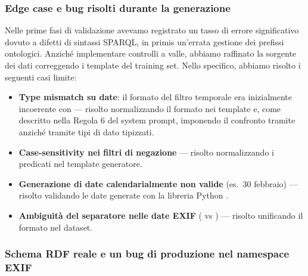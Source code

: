\newpage
\subsubsection{Edge case e bug risolti durante la generazione}\label{subsec:edge_cases_generazione}

Nelle prime fasi di validazione avevamo registrato un tasso di errore significativo dovuto a difetti di sintassi SPARQL, in primis un'errata gestione dei prefissi ontologici. Anziché implementare controlli a valle, abbiamo raffinato la sorgente dei dati correggendo i template del training set. Nello specifico, abbiamo risolto i seguenti casi limite:

\begin{itemize}
  \item \textbf{Type mismatch su date}: il formato del filtro temporale era inizialmente incoerente con  --- risolto normalizzando il formato nei template e, come descritto nella Regola 6 del system prompt, imponendo il confronto tramite  anziché tramite tipi di dato tipizzati.
  \item \textbf{Case-sensitivity nei filtri di negazione} --- risolto normalizzando i predicati nel template generatore.
  \item \textbf{Generazione di date calendarialmente non valide} (es.\ 30 febbraio) --- risolto validando le date generate con la libreria Python .
  \item \textbf{Ambiguità del separatore nelle date EXIF} (\code{:} vs \code{-}) --- risolto unificando il formato nel dataset.
\end{itemize}
\vspace{-0.8em}
\subsubsection{Schema RDF reale e un bug di produzione nel namespace EXIF}\label{subsec:bug_exif_namespace}


